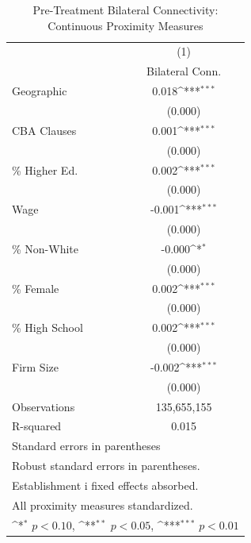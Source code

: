 \begin{table}[htbp]\centering
\def\sym#1{\ifmmode^{#1}\else\(^{#1}\)\fi}
\caption{Pre-Treatment Bilateral Connectivity: Continuous Proximity Measures}
\begin{tabular}{l*{1}{c}}
\toprule
                    &\multicolumn{1}{c}{(1)}\\
                    &\multicolumn{1}{c}{Bilateral Conn.}\\
\midrule
Geographic          &       0.018\sym{***}\\
                    &     (0.000)         \\
\addlinespace
CBA Clauses         &       0.001\sym{***}\\
                    &     (0.000)         \\
\addlinespace
\% Higher Ed.       &       0.002\sym{***}\\
                    &     (0.000)         \\
\addlinespace
Wage                &      -0.001\sym{***}\\
                    &     (0.000)         \\
\addlinespace
\% Non-White        &      -0.000\sym{*}  \\
                    &     (0.000)         \\
\addlinespace
\% Female           &       0.002\sym{***}\\
                    &     (0.000)         \\
\addlinespace
\% High School      &       0.002\sym{***}\\
                    &     (0.000)         \\
\addlinespace
Firm Size           &      -0.002\sym{***}\\
                    &     (0.000)         \\
\midrule
Observations        & 135,655,155         \\
R-squared           &       0.015         \\
\bottomrule
\multicolumn{2}{l}{\footnotesize Standard errors in parentheses}\\
\multicolumn{2}{l}{\footnotesize Robust standard errors in parentheses.}\\
\multicolumn{2}{l}{\footnotesize Establishment i fixed effects absorbed.}\\
\multicolumn{2}{l}{\footnotesize All proximity measures standardized.}\\
\multicolumn{2}{l}{\footnotesize \sym{*} \(p<0.10\), \sym{**} \(p<0.05\), \sym{***} \(p<0.01\)}\\
\end{tabular}
\end{table}

